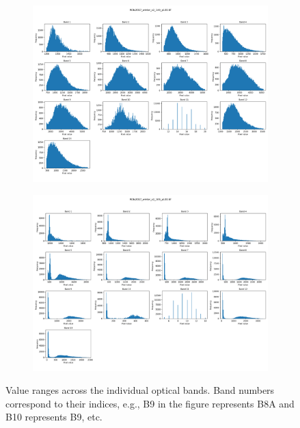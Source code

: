 \begin{figure}[h!]
    \vspace{0.5em}
    \begin{subfigure}{0.5\textwidth}
        \centering
        \includegraphics[width=\linewidth]{img/data_ranges/sample_3.png}
        \label{fig:sub3}
    \end{subfigure}
    \hfill
    \begin{subfigure}{0.5\textwidth}
        \centering
        \includegraphics[width=\linewidth]{img/data_ranges/sample_4.png}
        \label{fig:sub4}
    \end{subfigure}

    \caption{Value ranges across the individual optical bands. Band numbers correspond to their indices, e.g., B9 in the figure represents B8A and B10 represents B9, etc.}

    \label{fig:data_ranges}
\end{figure}

